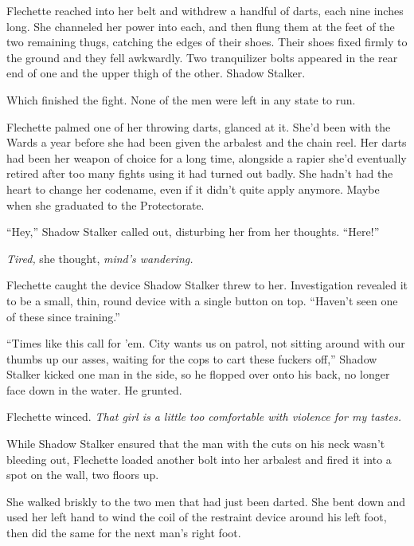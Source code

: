 Flechette reached into her belt and withdrew a handful of darts, each nine inches long.  She channeled her power into each, and then flung them at the feet of the two remaining thugs, catching the edges of their shoes.  Their shoes fixed firmly to the ground and they fell awkwardly.  Two tranquilizer bolts appeared in the rear end of one and the upper thigh of the other.  Shadow Stalker.



Which finished the fight.  None of the men were left in any state to run.



Flechette palmed one of her throwing darts, glanced at it.  She'd been with the Wards a year before she had been given the arbalest and the chain reel.  Her darts had been her weapon of choice for a long time, alongside a rapier she'd eventually retired after too many fights using it had turned out badly.  She hadn't had the heart to change her codename, even if it didn't quite apply anymore.  Maybe when she graduated to the Protectorate.



``Hey,'' Shadow Stalker called out, disturbing her from her thoughts.  ``Here!''



\emph{Tired,} she thought, \emph{mind's wandering.}



Flechette caught the device Shadow Stalker threw to her.  Investigation revealed it to be a small, thin, round device with a single button on top.  ``Haven't seen one of these since training.''



``Times like this call for 'em.  City wants us on patrol, not sitting around with our thumbs up our asses, waiting for the cops to cart these fuckers off,'' Shadow Stalker kicked one man in the side, so he flopped over onto his back, no longer face down in the water.  He grunted.



Flechette winced.  \emph{That girl is a little too comfortable with violence for my tastes.}



While Shadow Stalker ensured that the man with the cuts on his neck wasn't bleeding out, Flechette  loaded another bolt into her arbalest and fired it into a spot on the wall, two floors up.



She walked briskly to the two men that had just been darted.  She bent down and used her left hand to wind the coil of the restraint device around his left foot, then did the same for the next man's right foot.



